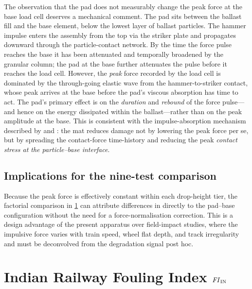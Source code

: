 The observation that the pad does not measurably change the peak force at
the base load cell deserves a mechanical comment. The pad sits between
the ballast fill and the base element, below the lowest layer of ballast
particles. The hammer impulse enters the assembly from the top via the
striker plate and propagates downward through the particle-contact
network. By the time the force pulse reaches the base it has been
attenuated and temporally broadened by the granular column; the pad at the
base further attenuates the pulse before it reaches the load cell.
However, the \emph{peak} force recorded by the load cell is dominated by
the through-going elastic wave from the hammer-to-striker contact, whose
peak arrives at the base before the pad's viscous absorption has time to
act. The pad's primary effect is on the \emph{duration} and
\emph{rebound} of the force pulse---and hence on the energy dissipated
within the ballast---rather than on the peak amplitude at the base. This
is consistent with the impulse-absorption mechanism described by
\citet{SolSanchez2015} and \citet{Navaratnarajah2017}: the mat reduces
damage not by lowering the peak force per se, but by spreading the
contact-force time-history and reducing the peak \emph{contact stress at
the particle--base interface}.

\subsection{Implications for the nine-test comparison}

Because the peak force is effectively constant within each drop-height
tier, the factorial comparison in \cref{sec:imp-FIIN} can attribute
differences in \FIIN{} directly to the pad--base configuration without
the need for a force-normalisation correction. This is a design advantage
of the present apparatus over field-impact studies, where the impulsive
force varies with train speed, wheel flat depth, and track irregularity
and must be deconvolved from the degradation signal post hoc.

\section{Indian Railway Fouling Index \texorpdfstring{$\mathit{FI}_{\mathrm{IN}}$}{FI\_IN}}
\label{sec:imp-FIIN}

